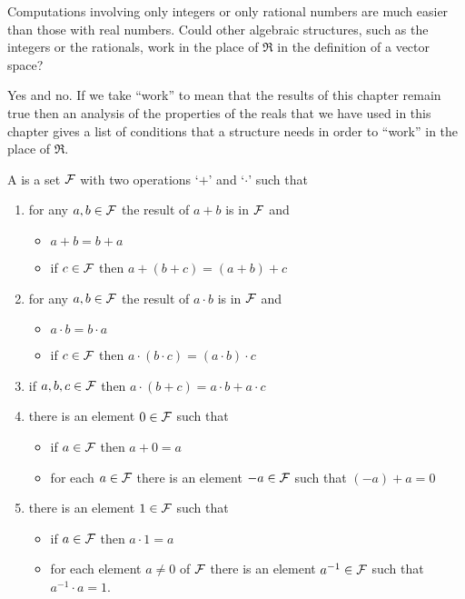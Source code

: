 Computations involving only integers or only rational numbers are much
easier than those with real numbers.
Could other algebraic structures, such as the integers or the rationals,
work in the
place of \( \Re \) in the definition of a vector space?

Yes and no.
If we take ``work'' to mean that the results of this chapter
remain true
then an analysis of the properties of the reals that we have
used in this chapter gives a list of conditions that a structure
needs in order to ``work'' in the place of $\Re$.

\begin{shadebox}
\begin{trivlist}
\item[\hskip \labelsep{\bf Definition.}]
A  is a set 
\( \mathcal{F} \) with two operations
`\( + \)'
and `\( \cdot \)' such that
\begin{enumerate}
   \item for any \( a,b\in\mathcal{F} \) the result of \( a+b \) is in \( \mathcal{F} \) and
      \begin{itemize}
         \item \( a+b=b+a \)
         \item if \( c\in\mathcal{F} \) then \( a+(b+c)=(a+b)+c \)
      \end{itemize}
   \item for any \( a,b\in\mathcal{F} \) the result of \( a\cdot b \) is in \( \mathcal{F} \) and
      \begin{itemize}
         \item \( a\cdot b=b\cdot a \)
         \item if \( c\in\mathcal{F} \) then \( a\cdot (b\cdot c)=(a\cdot b)\cdot c \)
      \end{itemize}
   \item if \( a,b,c\in\mathcal{F} \) then \( a\cdot (b+c)=a\cdot b+a\cdot c \)
   \item there is an element \( 0\in\mathcal{F} \) such that
      \begin{itemize}
         \item if \( a\in\mathcal{F} \) then \( a+0=a \)
         \item for each \( a\in\mathcal{F} \) there is an element \( -a\in\mathcal{F} \)
                such that \( (-a)+a=0 \)
      \end{itemize}
   \item there is an element \( 1\in\mathcal{F} \) such that
      \begin{itemize}
         \item if \( a\in\mathcal{F} \) then \( a\cdot 1=a \)
         \item for each element \( a\neq 0 \) of \( \mathcal{F} \)
                there is an element \( a^{-1}\in\mathcal{F} \)
                such that \( a^{-1}\cdot a=1 \).
      \end{itemize}
\end{enumerate}
\end{trivlist}
\end{shadebox}

